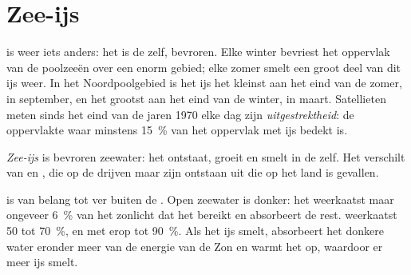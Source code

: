 \section{Zee-ijs}

 is weer iets anders: het is de  zelf, bevroren. Elke winter
bevriest het oppervlak van de poolzeeën over een enorm gebied; elke zomer
smelt een groot deel van dit ijs weer. In het Noordpoolgebied is het ijs
het kleinst aan het eind van de zomer, in september, en het grootst aan
het eind van de winter, in maart. Satellieten meten sinds het eind van de
jaren 1970 elke dag zijn \emph{uitgestrektheid}: de oppervlakte  waar
minstens 15~\% van het oppervlak met ijs bedekt is.

\begin{definition}\label{def:g8:ice-on-earth:sea-ice}
\emph{Zee-ijs} is bevroren zeewater: het ontstaat, groeit en
smelt in de  zelf. Het verschilt van  en , die op
de  drijven maar zijn ontstaan uit  die op het land is gevallen.
\end{definition}

 is van belang tot ver buiten de . Open zeewater is donker: het
weerkaatst maar ongeveer 6~\% van het zonlicht dat het bereikt en
absorbeert de rest.  weerkaatst 50 tot 70~\%, en  met
 erop tot 90~\%. Als het ijs smelt, absorbeert het donkere water
eronder meer van de energie van de Zon en warmt het op, waardoor er meer
ijs smelt.

